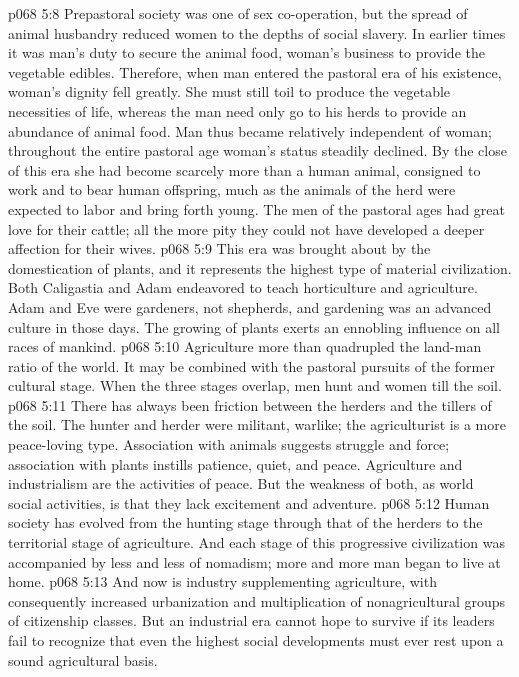 \vs p068 5:8 Prepastoral society was one of sex co\hyp{}operation, but the spread of animal husbandry reduced women to the depths of social slavery. In earlier times it was man’s duty to secure the animal food, woman’s business to provide the vegetable edibles. Therefore, when man entered the pastoral era of his existence, woman’s dignity fell greatly. She must still toil to produce the vegetable necessities of life, whereas the man need only go to his herds to provide an abundance of animal food. Man thus became relatively independent of woman; throughout the entire pastoral age woman’s status steadily declined. By the close of this era she had become scarcely more than a human animal, consigned to work and to bear human offspring, much as the animals of the herd were expected to labor and bring forth young. The men of the pastoral ages had great love for their cattle; all the more pity they could not have developed a deeper affection for their wives.
\pc \vs p068 5:9 \bibnobreakspace {} This era was brought about by the domestication of plants, and it represents the highest type of material civilization. Both Caligastia and Adam endeavored to teach horticulture and agriculture. Adam and Eve were gardeners, not shepherds, and gardening was an advanced culture in those days. The growing of plants exerts an ennobling influence on all races of mankind.
\vs p068 5:10 Agriculture more than quadrupled the land\hyp{}man ratio of the world. It may be combined with the pastoral pursuits of the former cultural stage. When the three stages overlap, men hunt and women till the soil.
\vs p068 5:11 There has always been friction between the herders and the tillers of the soil. The hunter and herder were militant, warlike; the agriculturist is a more peace\hyp{}loving type. Association with animals suggests struggle and force; association with plants instills patience, quiet, and peace. Agriculture and industrialism are the activities of peace. But the weakness of both, as world social activities, is that they lack excitement and adventure.
\pc \vs p068 5:12 Human society has evolved from the hunting stage through that of the herders to the territorial stage of agriculture. And each stage of this progressive civilization was accompanied by less and less of nomadism; more and more man began to live at home.
\vs p068 5:13 And now is industry supplementing agriculture, with consequently increased urbanization and multiplication of nonagricultural groups of citizenship classes. But an industrial era cannot hope to survive if its leaders fail to recognize that even the highest social developments must ever rest upon a sound agricultural basis.
